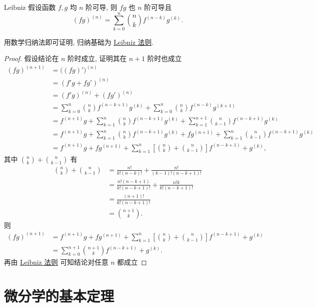 \documentclass[cn,toc=twocol]{elegantbook}
\begin{document}
\begin{theorem}{Leibniz}
	假设函数 $f,g$ 均 $n$ 阶可导, 则 $fg$ 也 $n$ 阶可导且
	\[
		(fg)^{(n)} = \sum_{k = 0}^{n}{n \choose k} f^{(n - k)}g^{(k)}.
	\]
\end{theorem}
\begin{idea*}
	用数学归纳法即可证明, 归纳基础为 \hyperref[thm:Leibniz1]{Leibniz 法则}.
\end{idea*}
\begin{proof}
	假设结论在 $n$ 阶时成立, 证明其在 $n+1$ 阶时也成立
	\[
	\begin{aligned}
		(fg)^{(n+1)} &= \bigl((fg)'\bigr)^{(n)}\\
		&= (f'g + fg')^{(n)}\\
		&= (f'g)^{(n)} + (fg')^{(n)}\\
		&= \sum_{k = 0}^{n} {n \choose k} f^{(n - k + 1)}g^{(k)} + \sum_{k = 0}^{n} {n \choose k} f^{(n - k)}g^{(k + 1)}\\
		&= f^{(n + 1)}g + \sum_{k = 1}^{n} {n \choose k} f^{(n - k + 1)}g^{(k)} + \sum_{k = 1}^{n + 1} {n \choose k - 1}f^{(n - k + 1)}g^{(k)}\\
		&= f^{(n + 1)}g + \sum_{k = 1}^{n} {n \choose k} f^{(n - k + 1)}g^{(k)} + fg^{(n + 1)} +\sum_{k = 1}^{n} {n \choose k - 1} f^{(n - k + 1)}g^{(k)}\\
		&= f^{(n + 1)}g + fg^{(n + 1)} + \sum_{k = 1}^{n} \left[{n \choose k} + {n \choose k - 1}\right] f^{(n - k + 1)} + g^{(k)},
	\end{aligned}
	\]
	其中 ${n \choose k} + {n \choose k - 1}$ 有
	\[
	\begin{aligned}
		{n \choose k} + {n \choose k - 1} &= \frac{n!}{k!(n-k)!} + \frac{n!}{(k-1)!(n-k+1)!}\\
		&= \frac{n!(n-k+1)}{k!(n-k+1)!} + \frac{n!k}{k!(n-k+1)!}\\
		&= \frac{(n+1)!}{k!(n-k+1)!}\\
		&= {n+1 \choose k}.
	\end{aligned}
	\]
	则
	\[
	\begin{aligned}
		(fg)^{(n+1)} &= f^{(n + 1)}g + fg^{(n + 1)} + \sum_{k = 1}^{n} \left[{n \choose k} + {n \choose k - 1}\right] f^{(n - k + 1)} + g^{(k)} \\
		&= \sum_{k = 0}^{n + 1} {n+1 \choose k} f^{(n - k + 1)} + g^{(k)}.
	\end{aligned}
	\]
	再由 \hyperref[thm:Leibniz1]{Leibniz 法则} 可知结论对任意 $n$ 都成立
\end{proof}

\section{微分学的基本定理}
\end{document}
